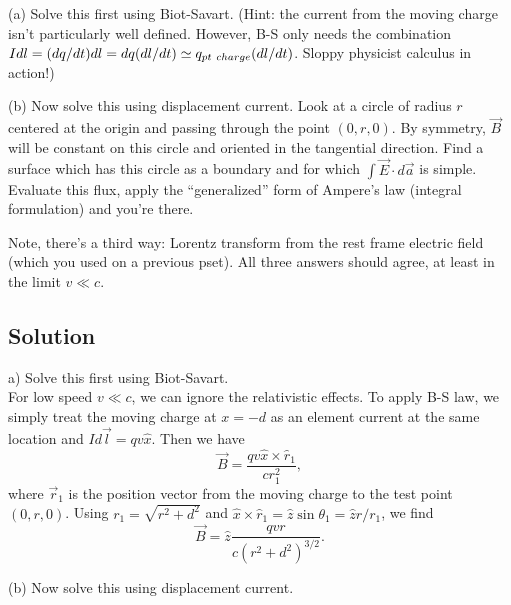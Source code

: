 \documentclass[solutions]{esg8022pset}
\begin{document}
\par\noindent (a)  Solve this first using Biot-Savart.  (Hint:
the current from the moving charge isn't particularly well defined.
However, B-S only needs the combination $I dl = (dq/dt) dl = dq
(dl/dt) \simeq q_{\rm pt\ charge}(dl/dt)$.  Sloppy physicist calculus
in action!)

\par\noindent (b)  Now solve this using displacement current.
Look at a circle of radius $r$ centered at the origin and passing
through the point $(0,r,0)$.  By symmetry, $\vec B$ will be constant
on this circle and oriented in the tangential direction.  Find a
surface which has this circle as a boundary and for which $\int \vec
E\cdot d\vec a$ is simple.  Evaluate this flux, apply the
``generalized'' form of Ampere's law (integral formulation) and you're
there.

\par\noindent Note, there's a third way: Lorentz transform from the
rest frame electric field (which you used on a previous pset).  All
three answers should agree, at least in the limit $v \ll c$.

\subsection{Solution}
a) Solve this first using Biot-Savart.\\

For low speed $v\ll c$, we can ignore the relativistic effects.  To
apply B-S law, we simply treat the moving charge at $x=-d$ as an
element current at the same location and $I d\vec{l}=qv\hat{x}$.  Then
we have
\begin{equation}
\vec{B}= \frac{qv\hat{x}\times\hat{r}_1}{cr_1^2},
\end{equation}
where $\vec{r}_1$ is the position vector from the moving charge to the
test point $(0,r,0)$.  Using $r_1 = \sqrt{r^2 + d^2}$ and $\hat
x\times\hat r_1 = \hat z\sin\theta_1 = \hat z r/r_1$, we find
\begin{equation}
\vec{B}= \hat{z}\frac{qvr}{c(r^2+d^2)^{3/2}}.
\end{equation}

(b) Now solve this using displacement current.\\
\end{document}
